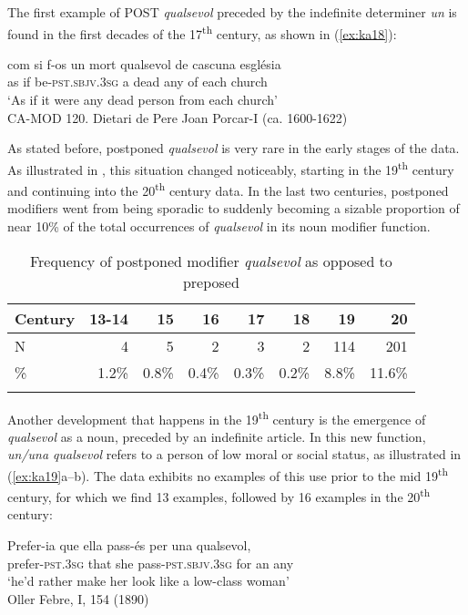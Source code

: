 \documentclass[output=paper,colorlinks,citecolor=brown]{langscibook}
\begin{document}
The first example of POST \textit{qualsevol} preceded by the indefinite determiner \textit{un} is found in the first decades of the 17\textsuperscript{th} century, as shown in (\ref{ex:ka18}):

\ea \label{ex:ka18}
\gll com si f-os un mort qualsevol de cascuna església\\
    as if be-\textsc{pst.sbjv.3sg} a dead any of each church\\
\glt ‘As if it were any dead person from each church’\\
    CA-MOD 120. Dietari de Pere Joan Porcar-I (ca. 1600-1622)\\
\z

As stated before, postponed \textit{qualsevol} is very rare in the early stages of the data. As illustrated in , this situation changed noticeably, starting in the 19\textsuperscript{th} century and continuing into the 20\textsuperscript{th} century data. In the last two centuries, postponed modifiers went from being sporadic to suddenly becoming a sizable proportion of near 10\% of the total occurrences of \textit{qualsevol} in its noun modifier function.

\begin{table}
    \begin{tabular}{lrrrrrrr} 
    \lsptoprule
    Century & 13-14	& 15 & 16 & 17 & 18 & 19 & 20 \\
     \midrule
    N & 4 & 5 & 2 & 3 & 2 & 114	& 201 \\
    \% &  1.2\%	& 0.8\%	& 0.4\%	& 0.3\%	& 0.2\%	& 8.8\%	& 11.6\% \\
    \lspbottomrule
    \end{tabular}
    \caption{Frequency of postponed modifier \textit{qualsevol} as opposed to preposed}
    \label{tab:ka7}
\end{table}  

Another development that happens in the 19\textsuperscript{th} century is the emergence of \textit{qualsevol} as a noun, preceded by an indefinite article. In this new function, \textit{un\slash una qualsevol} refers to a person of low moral or social status, as illustrated in (\ref{ex:ka19}a--b). The data exhibits no examples of this use prior to the mid 19\textsuperscript{th} century, for which we find 13 examples, followed by 16 examples in the 20\textsuperscript{th} century:

\ea \label{ex:ka19}
\ea\label{ex:ka19a} \gll Prefer-ia que ella pass-és per una qualsevol, \\
        prefer-\textsc{pst.3sg} that she pass-\textsc{pst.sbjv.3sg} for an any\\
    \glt ‘he’d rather make her look like a low-class woman’ \\
        Oller Febre, I, 154 (1890)
        
\end{document}
